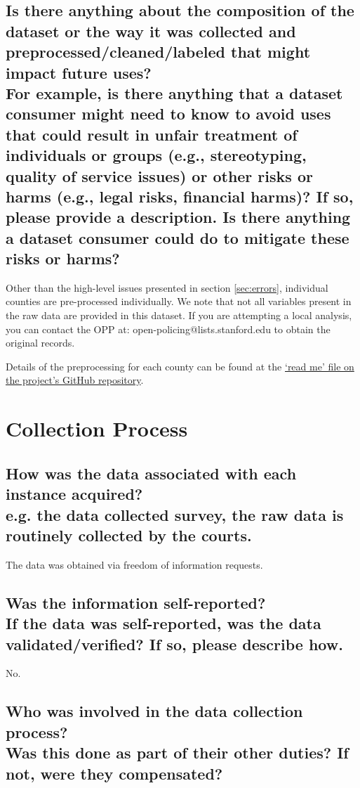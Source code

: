 \documentclass[letterpaper, 10 pt, conference]{ieeeconf}  %
\newcommand{\subtitle}[1]{{\\ \small \normalfont \color{purple} #1}}
\begin{document}
\subsection{Is there anything about the composition of the dataset or the way it was collected and preprocessed/cleaned/labeled that might impact future uses? \subtitle{For example, is there anything that a dataset consumer might need to know to avoid uses that could result in unfair treatment of individuals or groups (e.g., stereotyping, quality of service issues) or other risks or harms (e.g., legal risks, financial harms)? If so, please provide a description. Is there anything a dataset consumer could do to mitigate these risks or harms?}}

Other than the high-level issues presented in section \ref{sec:errors}, individual counties are pre-processed individually. We note that not all variables present in the raw data are provided in this dataset. If you are attempting a local analysis, you can contact the OPP at: open-policing@lists.stanford.edu to obtain the original records.

Details of the preprocessing for each county can be found at the \href{https://github.com/stanford-policylab/opp/blob/master/data_readme.md}{`read me' file on the project's GitHub repository}.

\section{Collection Process}

\subsection{How was the data associated with each instance acquired? \subtitle {e.g. the data collected survey, the raw data is routinely collected by the courts.}}

The data was obtained via freedom of information requests.

\subsection{Was the information self-reported? \subtitle{If the data was self-reported, was the data validated/verified? If so, please describe how.}}

No.

\subsection{Who was involved in the data collection process? \subtitle{Was this done as part of their other duties? If not, were they compensated?}}
 
\end{document}
